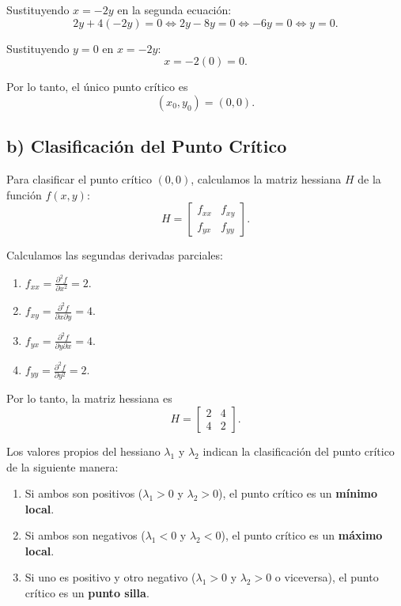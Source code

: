 \documentclass{article}
\begin{document}
Sustituyendo \( x = -2y \) en la segunda ecuación:
\[
2y + 4(-2y) = 0 \iff 2y - 8y = 0 \iff -6y = 0 \iff y = 0.
\]

Sustituyendo \( y = 0 \) en \( x = -2y \):
\[
x = -2(0) = 0.
\]

Por lo tanto, el único punto crítico es
\[
(x_0, y_0) = (0, 0).
\]

\subsection*{b) Clasificación del Punto Crítico}
Para clasificar el punto crítico \( (0, 0) \), calculamos la matriz hessiana \( H \) de la función \( f(x, y) \):
\[
H = \begin{bmatrix}
	f_{xx} & f_{xy} \\
	f_{yx} & f_{yy}
\end{bmatrix}.
\]

Calculamos las segundas derivadas parciales:
\begin{enumerate}
	\item \( f_{xx} = \frac{\partial^2 f}{\partial x^2} = 2 \).
	\item \( f_{xy} = \frac{\partial^2 f}{\partial x \partial y} = 4 \).
	\item \( f_{yx} = \frac{\partial^2 f}{\partial y \partial x} = 4 \).
	\item \( f_{yy} = \frac{\partial^2 f}{\partial y^2} = 2 \).
\end{enumerate}

Por lo tanto, la matriz hessiana es
\[
H = \begin{bmatrix}
	2 & 4 \\
	4 & 2
\end{bmatrix}.
\]

Los valores propios del hessiano \( \lambda_1 \) y \( \lambda_2 \) indican la clasificación del punto crítico de la siguiente manera:
\begin{enumerate}
	\item Si ambos son positivos (\(\lambda_1 > 0 \) y \( \lambda_2 > 0 \)), el punto crítico es un \textbf{mínimo local}.
	\item Si ambos son negativos (\(\lambda_1 < 0 \) y \( \lambda_2 < 0 \)), el punto crítico es un \textbf{máximo local}.
	\item Si uno es positivo y otro negativo (\(\lambda_1 > 0 \) y \( \lambda_2 > 0 \) o viceversa), el punto crítico es un \textbf{punto silla}.
\end{enumerate}
\end{document}
